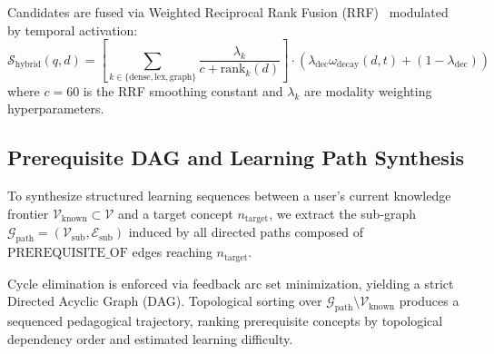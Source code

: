 Candidates are fused via Weighted Reciprocal Rank Fusion (RRF)~\cite{cormack2009rrf} modulated by temporal activation:
\begin{equation}
\mathcal{S}_{\text{hybrid}}(q, d) = \left[ \sum_{k \in \{\text{dense}, \text{lex}, \text{graph}\}} \frac{\lambda_k}{c + \text{rank}_k(d)} \right] \cdot \left( \lambda_{\text{dec}} \omega_{\text{decay}}(d, t) + (1 - \lambda_{\text{dec}}) \right)
\label{eq:hybrid_fusion}
\end{equation}
where $c=60$ is the RRF smoothing constant and $\lambda_k$ are modality weighting hyperparameters.

\subsection{Prerequisite DAG and Learning Path Synthesis}
To synthesize structured learning sequences between a user's current knowledge frontier $\mathcal{V}_{\text{known}} \subset \mathcal{V}$ and a target concept $n_{\text{target}}$, we extract the sub-graph $\mathcal{G}_{\text{path}} = (\mathcal{V}_{\text{sub}}, \mathcal{E}_{\text{sub}})$ induced by all directed paths composed of $\text{PREREQUISITE\_OF}$ edges reaching $n_{\text{target}}$.

Cycle elimination is enforced via feedback arc set minimization, yielding a strict Directed Acyclic Graph (DAG). Topological sorting over $\mathcal{G}_{\text{path}} \setminus \mathcal{V}_{\text{known}}$ produces a sequenced pedagogical trajectory, ranking prerequisite concepts by topological dependency order and estimated learning difficulty.
